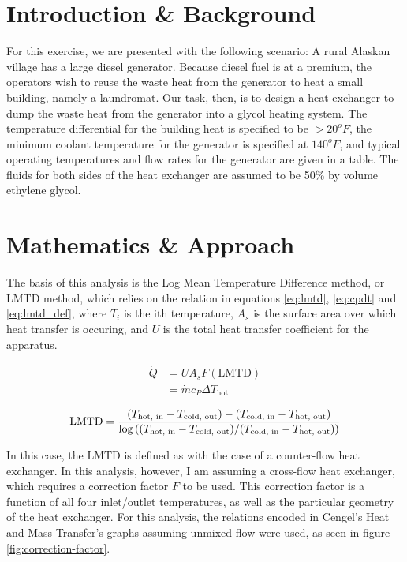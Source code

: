 \documentclass[12pt,letterpaper]{article}
\begin{document}
\sffamily

\section{Introduction \& Background}

For this exercise, we are presented with the following scenario: A rural Alaskan village has a large diesel generator. Because diesel fuel is at a premium, the operators wish to reuse the waste heat from the generator to heat a small building, namely a laundromat. Our task, then, is to design a heat exchanger to dump the waste heat from the generator into a glycol heating system. The temperature differential for the building heat is specified to be \(> 20^o F\), the minimum coolant temperature for the generator is specified at \(140^o F\), and typical operating temperatures and flow rates for the generator are given in a table.  The fluids for both sides of the heat exchanger are assumed to be 50\% by volume ethylene glycol.

\section{Mathematics \& Approach}

The basis of this analysis is the Log Mean Temperature Difference method, or LMTD method, which relies on the relation in equations \ref{eq:lmtd}, \ref{eq:cpdt} and \ref{eq:lmtd_def}, where \(T_i\) is the ith temperature, \(A_s\) is the surface area over which heat transfer is occuring, and \(U\) is the total heat transfer coefficient for the apparatus.

\begin{align}
\label{eq:lmtd}
\dot{Q} &= UA_s F(\textrm{LMTD})\\
\label{eq:cpdt}
        &= \dot{m}c_P \Delta T_{\textrm{hot}}
\end{align}

\begin{equation}
\label{eq:lmtd_def}
\textrm{LMTD} = 
\frac{ (T_{\textrm{hot, in}} - T_{\textrm{cold, out}} ) -
       (T_{\textrm{cold, in}} - T_{\textrm{hot, out}})
     }{
\log\left( 
    (T_{\textrm{hot, in}} - T_{\textrm{cold, out}} )
    \middle/ 
    (T_{\textrm{cold, in}} - T_{\textrm{hot, out}}) 
    \right) }
\end{equation}

In this case, the LMTD is defined as with the case of a counter-flow heat exchanger.  In this analysis, however, I am assuming a cross-flow heat exchanger, which requires a correction factor \(F\) to be used. This correction factor is a function of all four inlet/outlet temperatures, as well as the particular geometry of the heat exchanger.  For this analysis, the relations encoded in Cengel's Heat and Mass Transfer's graphs assuming unmixed flow were used, as seen in figure \ref{fig:correction-factor}.
\end{document}
